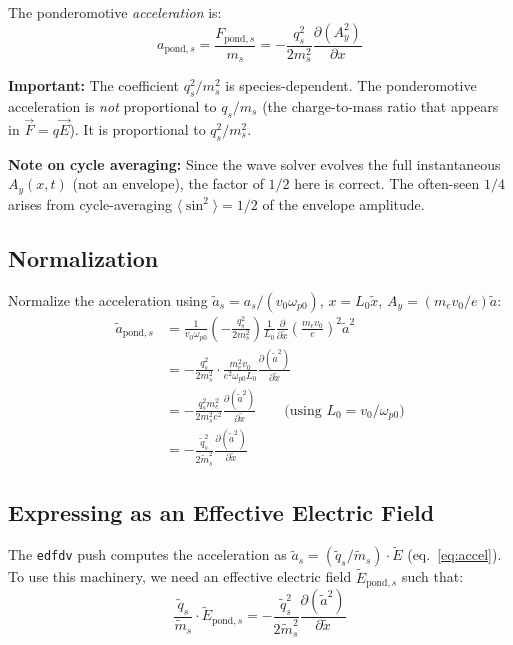 \documentclass[11pt]{article}
\newcommand{\tl}[1]{\tilde{#1}}
\newcommand{\wpz}{\omega_{p0}}
\newcommand{\code}[1]{\texttt{#1}}
\newcommand{\tq}{\tl{q}}
\newcommand{\tm}{\tl{m}}
\begin{document}
The ponderomotive \emph{acceleration} is:
\begin{equation}
    a_{\text{pond},s} = \frac{F_{\text{pond},s}}{m_s} = -\frac{q_s^2}{2m_s^2} \frac{\partial(A_y^2)}{\partial x}
    \label{eq:pond-accel-SI}
\end{equation}

\textbf{Important:} The coefficient $q_s^2/m_s^2$ is species-dependent. The ponderomotive acceleration is \emph{not} proportional to $q_s/m_s$ (the charge-to-mass ratio that appears in $\vec{F} = q\vec{E}$). It is proportional to $q_s^2/m_s^2$.

\textbf{Note on cycle averaging:} Since the wave solver evolves the full instantaneous $A_y(x,t)$ (not an envelope), the factor of $1/2$ here is correct. The often-seen $1/4$ arises from cycle-averaging $\langle\sin^2\rangle = 1/2$ of the envelope amplitude.

\subsection{Normalization}

Normalize the acceleration using $\tl{a}_s = a_s / (v_0 \wpz)$, $x = L_0 \tl{x}$, $A_y = (m_e v_0/e)\tl{a}$:
\begin{align}
    \tl{a}_{\text{pond},s}
    &= \frac{1}{v_0 \wpz} \left(-\frac{q_s^2}{2m_s^2}\right) \frac{1}{L_0} \frac{\partial}{\partial \tl{x}}\left(\frac{m_e v_0}{e}\right)^2 \tl{a}^2 \\[6pt]
    &= -\frac{q_s^2}{2m_s^2} \cdot \frac{m_e^2 v_0}{e^2 \wpz L_0} \frac{\partial(\tl{a}^2)}{\partial \tl{x}} \\[6pt]
    &= -\frac{q_s^2 m_e^2}{2m_s^2 e^2} \frac{\partial(\tl{a}^2)}{\partial \tl{x}}
    \qquad \text{(using $L_0 = v_0/\wpz$)} \\[6pt]
    &= -\frac{\tq_s^2}{2\tm_s^2} \frac{\partial(\tl{a}^2)}{\partial \tl{x}}
    \label{eq:pond-accel-norm}
\end{align}

\subsection{Expressing as an Effective Electric Field}

The \code{edfdv} push computes the acceleration as $\tl{a}_s = (\tq_s/\tm_s) \cdot \tl{E}$ (eq.~\ref{eq:accel}). To use this machinery, we need an effective electric field $\tl{E}_{\text{pond},s}$ such that:
\begin{equation}
    \frac{\tq_s}{\tm_s} \cdot \tl{E}_{\text{pond},s} = -\frac{\tq_s^2}{2\tm_s^2} \frac{\partial(\tl{a}^2)}{\partial \tl{x}}
\end{equation}
\end{document}
